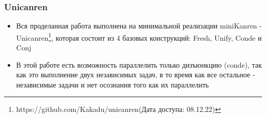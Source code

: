 \documentclass{beamer}
\newtheorem{rutheorem}{Теорема}
\begin{document}




\begin{frame}
  \frametitle{Unicanren}
  \begin{itemize}
  \item Вся проделанная работа выполнена на минимальной реализации miniKanren - Unicanren\footnote{{https://github.com/Kakadu/unicanren}(Дата доступа: 08.12.22)}, которая состоит из 4 базовых конструкций: Fresh, Unify, Conde и Conj
  \item В этой работе есть возможность параллелить только дизъюнкцию (conde), так как это выполнение двух независимых задач, в то время как все остальное - независимые задачи и нет осознания того как их параллелить
  
  \end{itemize}
  \end{frame}

\end{document}
